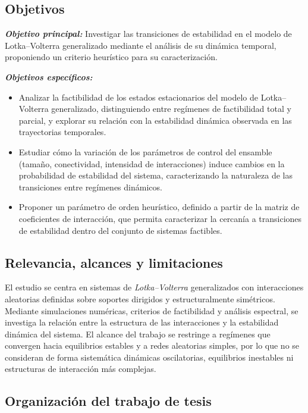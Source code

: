 \subsection*{Objetivos}\label{sec:Objetivos}

\textbf{\textit{Objetivo principal:}} Investigar las transiciones de estabilidad en el modelo de Lotka--Volterra generalizado mediante el análisis de su dinámica temporal, proponiendo un criterio heurístico para su caracterización.

\textbf{\textit{Objetivos específicos:}}
\begin{itemize}
	\item[1.] Analizar la factibilidad de los estados estacionarios del modelo de Lotka--Volterra generalizado, distinguiendo entre regímenes de factibilidad total y parcial, y explorar su relación con la estabilidad dinámica observada en las trayectorias temporales.
	\item[2.] Estudiar cómo la variación de los parámetros de control del ensamble (tamaño, conectividad, intensidad de interacciones) induce cambios en la probabilidad de estabilidad del sistema, caracterizando la naturaleza de las transiciones entre regímenes dinámicos.
	\item[3.] Proponer un parámetro de orden heurístico, definido a partir de la matriz de coeficientes de interacción, que permita caracterizar la cercanía a transiciones de estabilidad dentro del conjunto de sistemas factibles.
\end{itemize}

\subsection*{Relevancia, alcances y limitaciones}

El estudio se centra en sistemas de \textit{Lotka--Volterra} generalizados con interacciones aleatorias definidas sobre soportes dirigidos y estructuralmente simétricos. Mediante simulaciones numéricas, criterios de factibilidad y análisis espectral, se investiga la relación entre la estructura de las interacciones y la estabilidad dinámica del sistema. El alcance del trabajo se restringe a regímenes que convergen hacia equilibrios estables y a redes aleatorias simples, por lo que no se consideran de forma sistemática dinámicas oscilatorias, equilibrios inestables ni estructuras de interacción más complejas.


\subsection*{Organización del trabajo de tesis}

